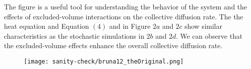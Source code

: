 The figure is a useful tool for understanding the behavior of the system and the effects of excluded-volume interactions on the collective diffusion rate.
The the heat equation and Equation $(4)$ and in Figure $2a$ and $2c$ show similar characteristics as the stochastic simulations in $2b$ and $2d$. 
We can observe that the excluded-volume effects enhance the overall collective diffusion rate.




\begin{figure}[]
	\centering
    \texttt{[image: sanity-check/bruna12\_theOriginal.png]}
\end{figure}


